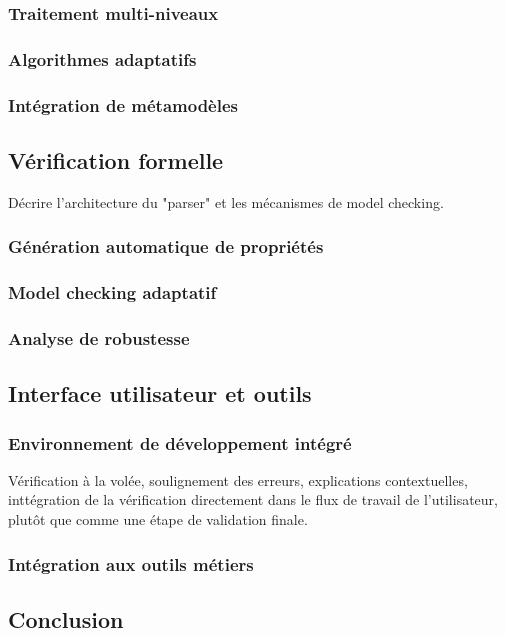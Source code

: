 \documentclass[a4paper,12pt]{article}
\begin{document}
\subsubsection{Traitement multi-niveaux}
\label{sec:orgb7d3528}
\subsubsection{Algorithmes adaptatifs}
\label{sec:org47a70ff}
\subsubsection{Intégration de métamodèles}
\label{sec:org53751fe}
\subsection{Vérification formelle}
\label{sec:org397fb48}
Décrire l'architecture du "parser" et les mécanismes de model checking.
\subsubsection{Génération automatique de propriétés}
\label{sec:org68f3e14}
\subsubsection{Model checking adaptatif}
\label{sec:org0f893c5}
\subsubsection{Analyse de robustesse}
\label{sec:orgc6405db}
\subsection{Interface utilisateur et outils}
\label{sec:org150d35a}
\subsubsection{Environnement de développement intégré}
\label{sec:org2fb565a}
Vérification à la volée, soulignement des erreurs, explications contextuelles, inttégration de la vérification directement dans le flux de travail de l'utilisateur, plutôt que comme une étape de validation finale.
\subsubsection{Intégration aux outils métiers}
\label{sec:org3482478}
\subsection{Conclusion}
\label{sec:org2778ea2}
\clearpage
\end{document}
